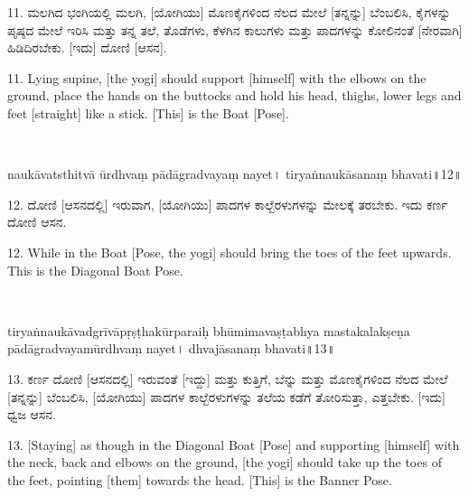\begin{kan}
11.	ಮಲಗಿದ ಭಂಗಿಯಲ್ಲಿ ಮಲಗಿ, [ಯೋಗಿಯು] ಮೊಣಕೈಗಳಿಂದ ನೆಲದ ಮೇಲೆ [ತನ್ನನ್ನು] ಬೆಂಬಲಿಸಿ, ಕೈಗಳನ್ನು ಪೃಷ್ಠದ ಮೇಲೆ ಇರಿಸಿ ಮತ್ತು ತನ್ನ ತಲೆ, ತೊಡೆಗಳು, ಕೆಳಗಿನ ಕಾಲುಗಳು ಮತ್ತು ಪಾದಗಳನ್ನು ಕೋಲಿನಂತೆ [ನೇರವಾಗಿ] ಹಿಡಿದಿರಬೇಕು. [ಇದು] ದೋಣಿ [ಆಸನ].
\end{kan}
\bigskip

\begin{eng}
11. Lying supine, [the yogi] should support [himself] with the elbows on the ground, place the hands on the buttocks and hold his head, thighs, lower legs and feet [straight] like a stick. [This] is the Boat [Pose].
\end{eng}


\newpage

~\vskip 1cm

\dummyimage
\begin{sans}
naukāvatsthitvā ūrdhvaṃ pādāgradvayaṃ nayet। tiryaṅnaukāsanaṃ bhavati॥12॥
\end{sans}
\bigskip

\begin{kan}
12.	ದೋಣಿ [ಆಸನದಲ್ಲಿ] ಇರುವಾಗ, [ಯೋಗಿಯು] ಪಾದಗಳ ಕಾಲ್ಬೆರಳುಗಳನ್ನು ಮೇಲಕ್ಕೆ ತರಬೇಕು. ಇದು ಕರ್ಣ ದೋಣಿ ಆಸನ.
\end{kan}
\bigskip

\begin{eng}
12. While in the Boat [Pose, the yogi] should bring the toes of the feet upwards. This is the Diagonal Boat Pose.
\end{eng}

\newpage

~\vskip 1cm

\dummyimage
\begin{sans}
tiryaṅnaukāvadgrīvāpṛṣṭhakūrparaiḥ bhūmimavaṣṭabhya mastakalakṣeṇa  pādāgradvayamūrdhvaṃ nayet। dhvajāsanaṃ bhavati॥13॥
\end{sans}
\bigskip

\begin{kan}
13.	ಕರ್ಣ ದೋಣಿ [ಆಸನದಲ್ಲಿ] ಇರುವಂತೆ [ಇದ್ದು] ಮತ್ತು ಕುತ್ತಿಗೆ, ಬೆನ್ನು ಮತ್ತು ಮೊಣಕೈಗಳಿಂದ ನೆಲದ ಮೇಲೆ [ತನ್ನನ್ನು] ಬೆಂಬಲಿಸಿ, [ಯೋಗಿಯು] ಪಾದಗಳ ಕಾಲ್ಬೆರಳುಗಳನ್ನು ತಲೆಯ ಕಡೆಗೆ ತೋರಿಸುತ್ತಾ, ಎತ್ತಬೇಕು. [ಇದು] ಧ್ವಜ ಆಸನ.
\end{kan}
\bigskip

\begin{eng}
13. [Staying] as though in the Diagonal Boat [Pose] and supporting [himself] with the neck, back and elbows on the ground, [the yogi] should take up the toes of the feet, pointing [them] towards the head. [This] is the Banner Pose.
\end{eng}
\newpage

